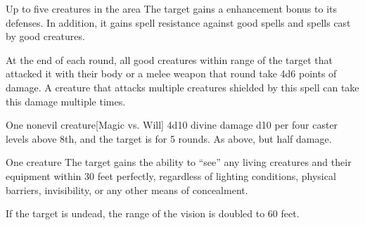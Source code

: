 \begin{comment}
\subsubsection{U-Z}
\end{comment}

\begin{spellheader}
    \spelldur{\durshort \dismissable}
\end{spellheader}
\begin{spelleffects}
    \begin{spelltargets}{Up to five creatures in the area}
        The target gains a  enhancement bonus to its defenses. In addition, it gains spell resistance against good spells and spells cast by good creatures.
        \par At the end of each round, all good creatures within \rngclose range of the target that attacked it with their body or a melee weapon that round take 4d6 points of damage. A creature that attacks multiple creatures shielded by this spell can take this damage multiple times.
    \end{spelltargets}
    \spellline
\end{spelleffects}

\begin{spellheader}
    \spellrng{\rngmed}
\end{spellheader}
\begin{spelleffects}
    \begin{spelltarget}{One nonevil creature}[Magic vs. Will]
        \spellsuccess 4d10 divine damage \add d10 per four caster levels above 8th, and the target is \sickened for 5 rounds.
        \spellfailure As above, but half damage.
    \end{spelltarget}
\end{spelleffects}

\begin{spellheader}
    \spelldur{\durlong \dismissable}
\end{spellheader}
\begin{spelleffects}
    \begin{spelltarget}{One creature}
        \spelleffect The target gains the ability to ``see'' any living creatures and their equipment within 30 feet perfectly, regardless of lighting conditions, physical barriers, invisibility, or any other means of concealment.

        If the target is undead, the range of the vision is doubled to 60 feet.
    \end{spelltarget}
\end{spelleffects}

